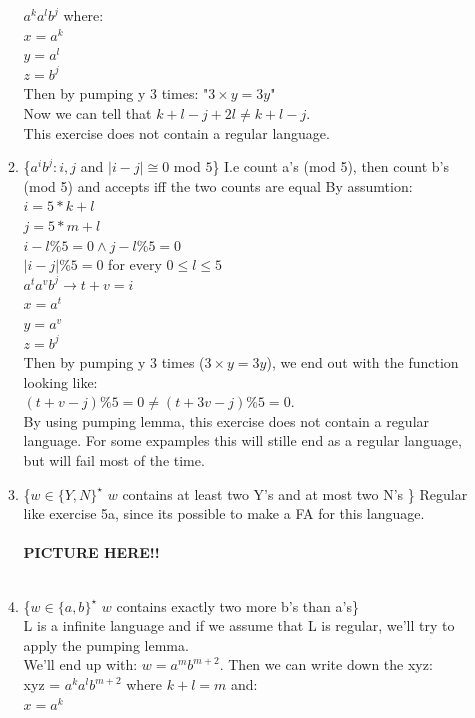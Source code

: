 \documentclass{article}
\begin{document}
\begin{enumerate}
\begin{enumerate}[label=(\alph*)]
			$a^ka^lb^j$ where:\\
			$x = a^k$\\
			$y = a^l$\\
			$z = b^j$\\
			Then by pumping y 3 times: "$3 \times y = 3y$"\\
			Now we can tell that $k+l-j + 2l \neq k + l -j$.\\
			This exercise does not contain a regular language.
			\item \{$a^{i}b^{j} : i,j$ and $|i - j| \cong 0$ mod $5$\} I.e count a's (mod 5), then count b's (mod 5) and accepts iff the two counts are equal
			By assumtion:\\
			$i = 5 * k + l$\\
			$j = 5 * m + l$\\
			$i - l \% 5 = 0 \land j - l \% 5 = 0$\\
			$|i - j| \% 5 = 0$ for every $0\leq l \le 5$ \\ 
			$a^ta^vb^j \rightarrow t + v = i$\\
			$x = a^t$\\
			$y = a^v$\\
			$z = b^j$\\
			Then by pumping y 3 times ($3 \times y = 3y$), we end out with the function looking like:\\
			$(t + v - j) \% 5 = 0 \neq (t + 3v - j) \% 5 = 0$. \\
			By using pumping lemma, this exercise does not contain a regular language. For some expamples this will stille end as a regular language, but will fail most of the time.
			\item \{$w \in \{ Y,N \}^{\star}$ $w$ contains at least two Y's and at most two N's \}
			Regular like exercise 5a, since its possible to make a FA for this language.\\~\\
			\textbf{PICTURE HERE!!}\\~\\
			\item \{$w \in \{ a,b \}^{\star}$ $w$ contains exactly two more b's than a's\}\\
			L is a infinite language and if we assume that L is regular, we'll try to apply the pumping lemma. \\
			We'll end up with: $w = a^mb^{m+2}$. Then we can write down the xyz:\\
			xyz = $a^ka^lb^{m+2}$ where $k + l = m$ and:\\
			$x = a^k$\\

\end{enumerate}
\end{enumerate}
\end{document}
